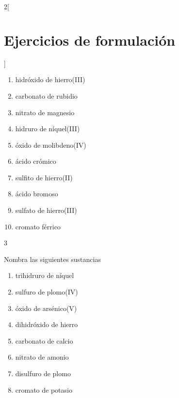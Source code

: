 \documentclass[10pt]{article}
\begin{document}
\begin{multicols*}{2}[
  \section{Ejercicios de formulación}
  ]
\begin{exercise}[
    tags    = {inorgánica,formulación,múltiple,2B},
    topics  = {química inorgánica,formulación,nomenclatura},
    source  = {Química 2B SAN 2016, p372, e18},
  ]
  \begin{enumerate}
    \item hidróxido de hierro(III)
    \item carbonato de rubidio
    \item nitrato de magnesio
    \item hidruro de níquel(III)
    \item óxido de molibdeno(IV)
    \item ácido crómico
    \item sulfito de hierro(II)
    \item ácido bromoso
    \item sulfato de hierro(III)
    \item cromato férrico
  \end{enumerate}
\end{exercise}

\begin{solution}
  \begin{enumerate}\begin{multicols}{3}
    \item {}
    \item {}
    \item {}
    \item {}
    \item {}
    \item {}
    \item {}
    \item {}
    \item {}
    \item {}
  \end{multicols}\end{enumerate}
\end{solution}




\begin{exercise}[
    tags    = {inorgánica,formulación,múltiple,2B},
    topics  = {química inorgánica,formulación,nomenclatura},
    source  = {Química 2B SAN 2016, p372, e19},
  ]
  Nombra las siguientes sustancias

  \begin{enumerate}
    \item trihidruro de níquel
    \item sulfuro de plomo(IV)
    \item óxido de arsénico(V)
    \item dihidróxido de hierro
    \item carbonato de calcio
    \item nitrato de amonio
    \item disulfuro de plomo
    \item cromato de potasio
  \end{enumerate}
\end{exercise}


\end{multicols*}
\end{document}
